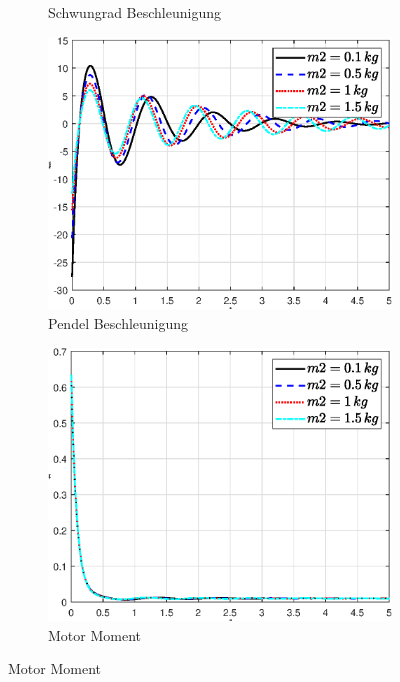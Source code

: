 \begin{figure}
\begin{subfigure}[b]{0.49 \linewidth}
        \caption{Schwungrad Beschleunigung}
        \label{fig:m2_phi_punkt_punkt}
    \end{subfigure}
    \begin{subfigure}[b]{0.49 \linewidth}
        \includegraphics[width=\linewidth]{plot_data/parameter/fig/m2/theta_punkt_punkt.eps}
        \caption{Pendel Beschleunigung}
        \label{fig:m2_theta_punkt_punkt}
    \end{subfigure}
    \begin{subfigure}[b]{0.49\linewidth}
        \includegraphics[width=\linewidth]{plot_data/parameter/fig/m2/tau.eps}
        \caption{Motor Moment}

\end{subfigure}
\end{figure}

